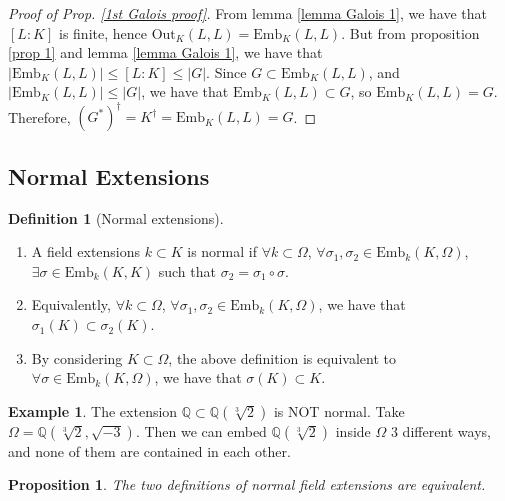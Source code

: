 \documentclass{article}
\theoremstyle{definition}
\newtheorem{defn}{Definition}[section]
\newtheorem{exmp}{Example}[section]
\theoremstyle{plain}%
\newtheorem{prop}[thm]{Proposition}
\theoremstyle{remark}
\newcommand{\Q}{\mathbb{Q}}
\newcommand{\Emb}{\text{Emb}}
\newcommand{\Out}{\text{Out}}
\begin{document}
\begin{proof}[Proof of Prop. \ref{1st Galois proof}]
From lemma \ref{lemma Galois 1}, we have that $[L : K]$ is finite, hence $\Out_K(L,L) = \Emb_K(L,L)$. But from proposition \ref{prop 1} and lemma \ref{lemma Galois 1}, we have that $|\Emb_K(L, L)| \le [L : K]  \le |G|$. Since $G \subset \Emb_K(L,L)$, and $|\Emb_K(L,L)| \le |G|$, we have that $\Emb_K(L,L) \subset G$, so $\Emb_K(L,L) = G$. Therefore, $(G^*)^{\dagger} = K^{\dagger} = \Emb_K(L,L) = G$.
\end{proof}

\subsection{Normal Extensions}

\begin{defn}[Normal extensions]
\hspace{0.1em}
\begin{enumerate}
    \item A field extensions $k \subset K$ is normal if $\forall k \subset \Omega$, $\forall \sigma_1, \sigma_2 \in \Emb_k(K, \Omega)$, $\exists \sigma \in \Emb_k(K,K)$ such that $\sigma_2 = \sigma_1 \circ \sigma$.
    \item Equivalently, $\forall k \subset \Omega$, $\forall \sigma_1, \sigma_2 \in \Emb_k(K, \Omega)$, we have that $\sigma_1(K) \subset \sigma_2(K)$.
    \item By considering $K \subset \Omega$, the above definition is equivalent to $\forall \sigma \in \Emb_k(K, \Omega)$, we have that $\sigma(K) \subset K$.
\end{enumerate}
\end{defn}

\begin{exmp}
The extension $\Q \subset \Q(\sqrt[3]{2})$ is NOT normal. Take $\Omega = \Q(\sqrt[3]{2}, \sqrt{-3})$. Then we can embed $ \Q(\sqrt[3]{2})$ inside $\Omega$ 3 different ways, and none of them are contained in each other.
\end{exmp}

\begin{prop}
The two definitions of normal field extensions are equivalent.
\end{prop}
\end{document}
